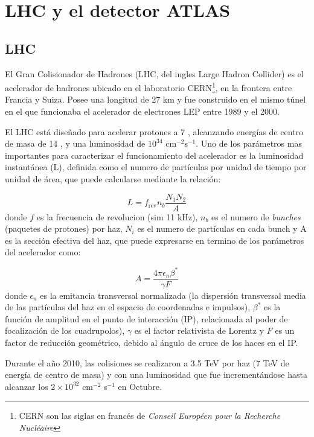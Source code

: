 \chapter{LHC y el detector ATLAS}


\section{LHC}

El Gran Colisionador de Hadrones (LHC, del ingles Large Hadron Collider) es el acelerador
de hadrones ubicado en el laboratorio CERN\footnote{CERN son las siglas en francés de
  \emph{Conseil Européen pour la Recherche Nucléaire}}, en la frontera entre Francia y Suiza.
Posee una longitud de 27 km y fue construido en el mismo túnel en el que funcionaba el acelerador
de electrones LEP entre 1989 y el 2000.

El LHC está diseñado para acelerar protones a 7 \tev, alcanzando energías de centro de masa de 14 \tev,
y una luminosidad de $10^{34}$ cm$^{-2}$s$^{-1}$.
Uno de los parámetros mas importantes para caracterizar el funcionamiento del acelerador es la
luminosidad instantánea (L), definida como el numero de partículas por unidad de tiempo por unidad de
área, que puede calcularse mediante la relación:

\begin{equation}
  L = f_\text{rev} n_b \frac{N_1 N_2}{A}
\end{equation}
%
donde $f$ es la frecuencia de revolucion (sim 11 kHz), $n_b$ es el numero de \emph{bunches}
(paquetes de protones) por haz, $N_i$ es el numero de partículas en cada bunch y A es la
sección efectiva del haz, que puede expresarse en termino de los parámetros del acelerador
como:

\begin{equation}
  A = \frac{4\pi \epsilon_n \beta^{*}}{\gamma F}
\end{equation}
%
donde $\epsilon_n$ es la emitancia transversal normalizada (la dispersión transversal media de las
partículas del haz en el espacio de coordenadas e impulsos), $\beta^{*}$ es la función de amplitud
en el punto de interacción (IP), relacionada al poder de focalización de los cuadrupolos), $\gamma$
es el factor relativista de Lorentz y $F$ es un factor de reducción geométrico, debido al ángulo
de cruce de los haces en el IP.


Durante el año 2010, las colisiones se realizaron a 3.5 TeV por haz (7 TeV de energía de centro de masa)
y con una luminosidad que fue incrementándose hasta alcanzar los $2 \times 10^{32}$ cm$^{-2}$ s$^{-1}$
en Octubre. %


